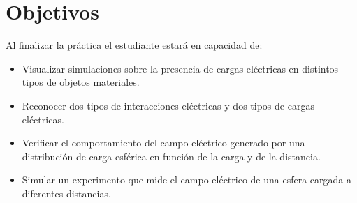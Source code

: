 \section{Objetivos}

Al finalizar la práctica el estudiante estará en capacidad de:

\begin{itemize}
    \item Visualizar simulaciones sobre la presencia de cargas eléctricas en
    distintos tipos de objetos materiales.
    \item Reconocer dos tipos de interacciones eléctricas y dos tipos de cargas
    eléctricas.
    \item Verificar el comportamiento del campo eléctrico generado por una
    distribución de carga esférica en función de la carga y de la distancia.
    \item Simular un experimento que mide el campo eléctrico de una esfera
    cargada a diferentes distancias.
\end{itemize}

\\